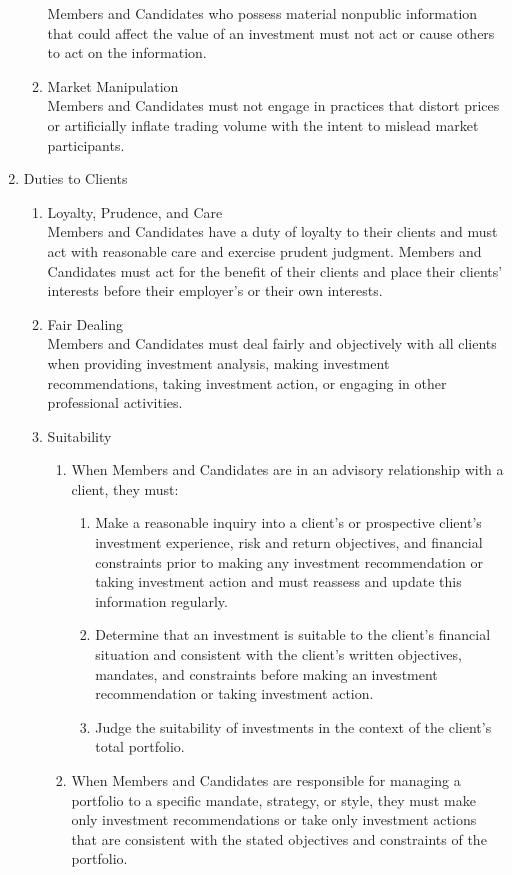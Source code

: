 \begin{definition}
\begin{enumerate}[label=\Roman*.]
\begin{enumerate}[label=\Alph*.]
Members and Candidates who possess material nonpublic information that could affect the value of an investment must not act or cause others to act on the information.
\item Market Manipulation\\
Members and Candidates must not engage in practices that distort prices or artificially inflate trading volume with the intent to mislead market participants.
\end{enumerate}
\item Duties to Clients
\begin{enumerate}[label=\Alph*.]
\setlength{\itemsep}{0pt}
\item Loyalty, Prudence, and Care\\
Members and Candidates have a duty of loyalty to their clients and must act with reasonable care and exercise prudent judgment. Members and Candidates must act for the benefit of their clients and place their clients’ interests before their employer’s or their own interests.
\item Fair Dealing\\
Members and Candidates must deal fairly and objectively with all clients when providing investment analysis, making investment recommendations, taking investment action, or engaging in other professional activities.
\item Suitability
\begin{enumerate}[label=\arabic*.]
\setlength{\itemsep}{0pt}
\item When Members and Candidates are in an advisory relationship with a client, they must:
\begin{enumerate}[label=\alph*.]
\setlength{\itemsep}{0pt}
\item Make a reasonable inquiry into a client’s or prospective client’s investment experience, risk and return objectives, and financial constraints prior to making any investment recommendation or taking investment action and must reassess and update this information regularly.
\item Determine that an investment is suitable to the client’s financial situation and consistent with the client’s written objectives, mandates, and constraints before making an investment recommendation or taking investment action.
\item Judge the suitability of investments in the context of the client’s total portfolio.
\end{enumerate}
\item When Members and Candidates are responsible for managing a portfolio to a specific mandate, strategy, or style, they must make only investment recommendations or take only investment actions that are consistent with the stated objectives and constraints of the portfolio.

\end{enumerate}
\end{enumerate}
\end{enumerate}
\end{definition}
